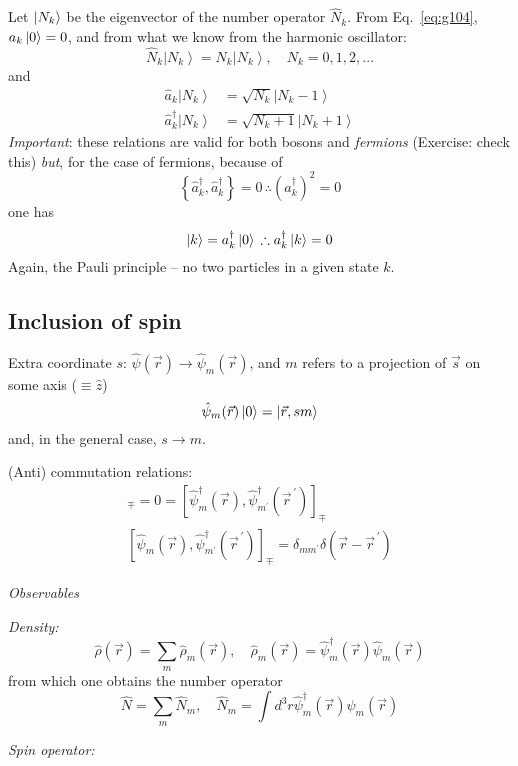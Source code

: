 \documentclass[12pt]{article}
\newcommand{\be}{\begin{equation}}
\newcommand{\ee}{\end{equation}}
\newcommand{\vecrp}{\ensuremath{\vec{r}^{\,\prime}}}
\begin{document}
Let $\ket{N_{k}}$ be the eigenvector of the number operator
$\hat{N}_{k}$. From Eq.~\eqref{eq:g104}, $a_{k}\ket{0}=0$, and from what we
know from the harmonic oscillator:
\be
\hat{N}_{k}\left|N_{k}\right\rangle=N_{k}\left|N_{k}\right\rangle, \quad N_{k}=0,1,2, \ldots
\ee
and
\be
\begin{aligned}
\hat{a}_{k}\left|N_{k}\right\rangle          &=\sqrt{N_{k}}\left|N_{k}-1\right\rangle\\
\hat{a}_{k}^{\dagger}\left|N_{k}\right\rangle&=\sqrt{N_{k}+1}\left|N_{k}+1\right\rangle
\end{aligned}
\ee
\emph{Important}: these relations are valid for both
bosons and \emph{fermions} (Exercise: check this)
\emph{but}, for the case of fermions, because of
\be
\left\{\hat{a}_{k}^{\dagger}, \hat{a}_{k}^{\dagger}\right\} = 0 \,\therefore\left(a_{k}^{\dagger}\right)^{2}=0
\ee
one has
\be
\ket{k} = a_k^\dagger\ket{0} \,\therefore a_k^\dagger\ket{k} = 0
\ee
Again, the Pauli principle
-- no two particles in a given state $k$.


\subsection{Inclusion of spin}

Extra coordinate $s$: $\hat{\psi}(\vec{r}) \rightarrow \hat{\psi}_{m}(\vec{r})$, and $m$ refers to a projection of $\vec{s}$ on some axis ($\equiv \hat{z}$)
\[
\hat{\psi}_{m}(\vec{r}) \ket{0} = \ket{\vec{r},sm}
\]
and, in the general case, $s \to m$.

\setcounter{equation}{113}
(Anti) commutation relations:
\begin{gather}
 [\hat{\psi}_{m}(\vec{r}), \hat{\psi}_{m^\prime}(\vecrp)]_\mp = 0 
=[\hat{\psi}_{m}^\dagger(\vec{r}), \hat{\psi}_{m^\prime}^\dagger(\vecrp)]_\mp\\
 [\hat{\psi}_{m}(\vec{r}), \hat{\psi}_{m^\prime}^\dagger(\vecrp)]_\mp =
 \delta_{mm^\prime}\delta(\vec{r}-\vecrp)
\end{gather}

\emph{Observables}

\emph{Density:}
\be
\hat{\rho}(\vec{r}) = \sum_m \hat{\rho}_m(\vec{r}),\quad
\hat{\rho}_m(\vec{r}) = \hat{\psi}_{m}^\dagger(\vec{r})\hat{\psi}_{m}(\vec{r})
\ee
from which one obtains the number operator
\be
\hat{N} = \sum_m \hat{N}_m,\quad
\hat{N}_m = \int d^3r \hat{\psi}_{m}^\dagger(\vec{r})\hat{\psi}_{m}(\vec{r})
\ee

\emph{Spin operator:}
\end{document}
